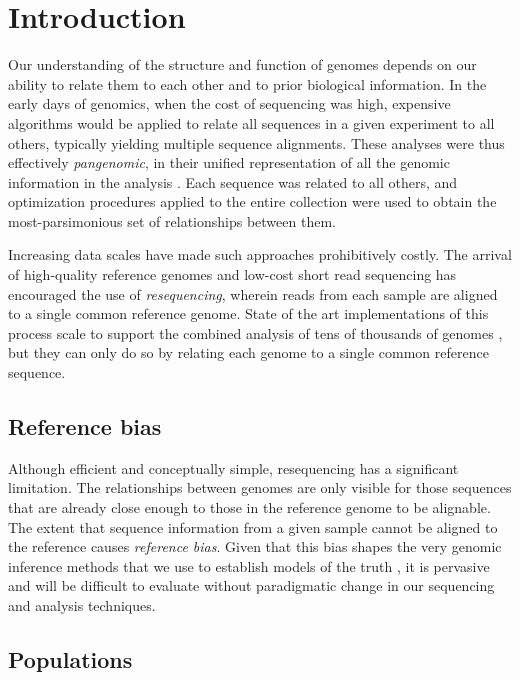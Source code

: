 \section{Introduction}

Our understanding of the structure and function of genomes depends on our ability to relate them to each other and to prior biological information.
In the early days of genomics, when the cost of sequencing was high, expensive algorithms would be applied to relate all sequences in a given experiment to all others, typically yielding multiple sequence alignments.
These analyses were thus effectively \emph{pangenomic}, in their unified representation of all the genomic information in the analysis \cite{computational2016computational}.
Each sequence was related to all others, and optimization procedures applied to the entire collection were used to obtain the most-parsimonious set of relationships between them.

Increasing data scales have made such approaches prohibitively costly.
The arrival of high-quality reference genomes and low-cost short read sequencing has encouraged the use of \emph{resequencing}, wherein reads from each sample are aligned to a single common reference genome.
State of the art implementations of this process scale to support the combined analysis of tens of thousands of genomes \cite{Poplin_2017}, but they can only do so by relating each genome to a single common reference sequence.

\subsection{Reference bias}

Although efficient and conceptually simple, resequencing has a significant limitation.
The relationships between genomes are only visible for those sequences that are already close enough to those in the reference genome to be alignable.
The extent that sequence information from a given sample cannot be aligned to the reference causes \emph{reference bias}.
Given that this bias shapes the very genomic inference methods that we use to establish models of the truth \cite{zook2014integrating}, it is pervasive and will be difficult to evaluate without paradigmatic change in our sequencing and analysis techniques.

\subsection{Populations}

